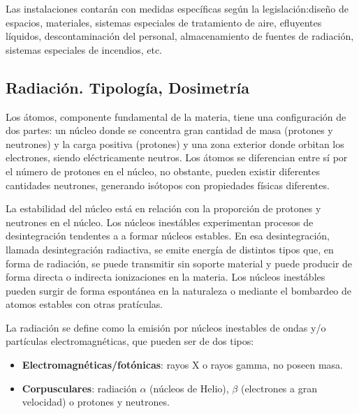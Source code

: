 Las instalaciones contarán con medidas específicas según la legislación:diseño de espacios, materiales, sistemas especiales de tratamiento de aire, efluyentes líquidos, descontaminación del personal, almacenamiento de fuentes de radiación, sistemas especiales de incendios, etc.
\subsection{Radiación. Tipología, Dosimetría}
Los átomos, componente fundamental de la materia, tiene una configuración de dos partes: un núcleo donde se concentra gran cantidad de masa (protones y neutrones) y la carga positiva (protones) y una zona exterior donde orbitan los electrones, siendo eléctricamente neutros. Los átomos se diferencian entre sí por el número de protones en el núcleo, no obstante, pueden existir diferentes cantidades neutrones, generando isótopos con propiedades físicas diferentes.

La estabilidad del núcleo está en relación con la proporción de protones y neutrones en el núcleo. Los núcleos inestábles experimentan procesos de desintegración tendentes a a formar núcleos estables. En esa desintegración, llamada desintegración radiactiva, se emite energía de distintos tipos que, en forma de radiación, se puede transmitir sin soporte material y puede producir de forma directa o indirecta ionizaciones en la materia. Los núcleos inestábles pueden surgir de forma espontánea en la naturaleza o mediante el bombardeo de atomos estables con otras pratículas.

La radiación se define como la emisión por núcleos inestables de ondas y/o partículas electromagnéticas, que pueden ser de dos tipos:
\begin{itemize}
    \item \textbf{Electromagnéticas/fotónicas}: rayos X o rayos gamma, no poseen masa.
    \item \textbf{Corpusculares}: radiación $\alpha$ (núcleos de Helio), $\beta$ (electrones a gran velocidad) o protones y neutrones.
\end{itemize}
